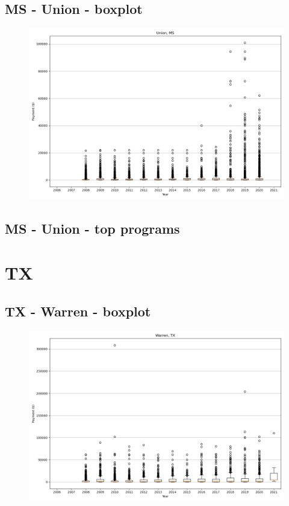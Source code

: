 \subsection*{MS - Union - boxplot}
\begin{figure}[h]
\centering
\includegraphics[width=7in]{../output/boxplots/counties/Union-MS_boxplot.png}
\end{figure}


\subsection*{MS - Union - top programs}

\newpage
\section*{TX}
\subsection*{TX - Warren - boxplot}
\begin{figure}[h]
\centering
\includegraphics[width=7in]{../output/boxplots/counties/Warren-TX_boxplot.png}
\end{figure}


